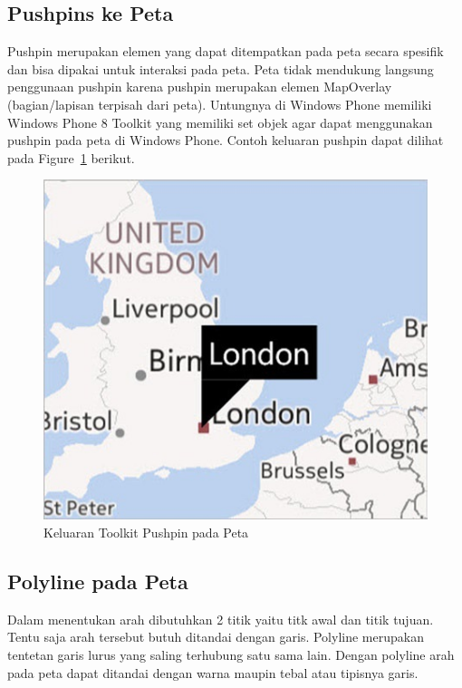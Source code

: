 \subsection{Pushpins ke Peta}
\label{subsec:Pushpins ke Peta}
\hspace{0.5cm} Pushpin merupakan elemen yang dapat ditempatkan pada peta secara spesifik dan bisa dipakai untuk interaksi pada peta. Peta tidak mendukung langsung penggunaan pushpin karena pushpin merupakan elemen MapOverlay (bagian/lapisan terpisah dari peta). Untungnya di Windows Phone memiliki Windows Phone 8 Toolkit yang memiliki set objek agar dapat menggunakan pushpin pada peta di Windows Phone. Contoh keluaran pushpin dapat dilihat pada Figure~\ref{fig:toolkit_pushpin} berikut.

\begin{figure}[!h]
	\centering
		\includegraphics[scale=0.5]{Gambar/toolkit_pushpin}
	\caption{Keluaran Toolkit Pushpin pada Peta}
	\label{fig:toolkit_pushpin}
\end{figure}

\subsection{Polyline pada Peta}
\label{subsec:Polyline pada Peta}
\hspace{0.5cm} Dalam menentukan arah dibutuhkan 2 titik yaitu titk awal dan titik tujuan. Tentu saja arah tersebut butuh ditandai dengan garis. Polyline merupakan tentetan garis lurus yang saling terhubung satu sama lain. Dengan polyline arah pada peta dapat ditandai dengan warna maupin tebal atau tipisnya garis. 

